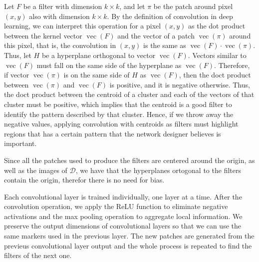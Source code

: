 \documentclass[a4paper,conference]{IEEEtran}
\DeclareMathOperator{\vect}{vec}
\newcommand{\D}{\mathcal{D}}
\begin{document}
Let $F$ be a filter with dimension $k \times k$, and let $\pi$ be the patch around pixel $(x,y)$ also with dimension $k \times k$. By the definition of convolution in deep learning, we can interpret this operation for a pixel $(x, y)$ as the dot product between the kernel vector $\vect(F)$ and the vector of a patch $\vect(\pi)$ around this pixel, that is, the convolution in $(x, y)$ is the same as $\vect(F) \cdot \vect(\pi)$. Thus, let $H$ be a hyperplane orthogonal to vector $\vect(F)$. Vectors similar to $\vect(F)$ must fall on the same side of the hyperplane as $\vect(F)$. Therefore, if vector $\vect(\pi)$ is on the same side of $H$ as $\vect(F)$, then the doct product between $\vect(\pi)$ and $\vect(F)$ is positive, and it is negative otherwise. Thus, the doct product between the centroid of a cluster and each of the vectors of that cluster must be positive, which implies that the centroid is a good filter to identify the pattern described by that cluster. Hence, if we throw away the negative values, applying convolution with centroids as filters must highlight regions that has a certain pattern that the network designer believes is important.

Since all the patches used to produce the filters are centered around the origin, as well as the images of $\D$, we have that the hyperplanes ortogonal to the filters contain the origin, therefor there is no need for bias.

Each convolutional layer is trained individually, one layer at a time. After the convolution operation, we apply the ReLU function to eliminate negative activations and the max pooling operation to aggregate local information. We preserve the output dimensions of convolutional layers so that we can use the same markers used in the previous layer. The new patches are generated from the previeus convolutional layer output and the whole process is repeated to find the filters of the next one.
\end{document}

